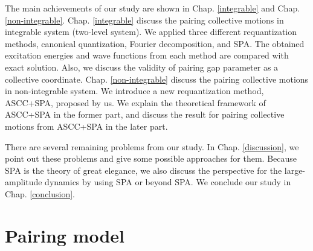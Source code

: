 \documentclass[11pt]{book} %
\begin{document}
The main achievements of our study are shown in Chap. \ref{integrable} and Chap. \ref{non-integrable}. Chap. \ref{integrable} discuss the pairing collective motions in integrable system (two-level system). We applied three different requantization methods, canonical quantization, Fourier decomposition, and SPA. The obtained excitation energies and wave functions from each method are compared with exact solution. Also, we discuss the validity of pairing gap parameter as a collective coordinate. Chap. \ref{non-integrable} discuss the pairing collective motions in non-integrable system. We introduce a new requantization method, ASCC+SPA, proposed by us. We explain the theoretical framework of ASCC+SPA in the former part, and discuss the result for pairing collective motions from ASCC+SPA in the later part.

There are several remaining problems from our study. In Chap. \ref{discussion}, we point out these problems and give some possible approaches for them. Because SPA is the theory of great elegance, we also discuss the perspective for the large-amplitude dynamics by using SPA or beyond SPA. We conclude our study in Chap. \ref{conclusion}.





\clearpage{\pagestyle{empty}\cleardoublepage}
\chapter{Pairing model}
\label{chap2}
\end{document}
